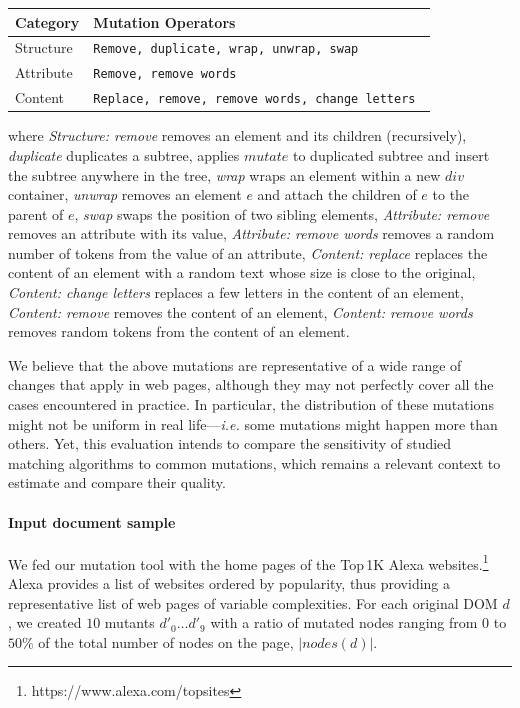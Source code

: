 \begin{center}
    \begin{table}[h]
    \begin{tabular}{l|l}
    \hline
    Category  & Mutation Operators                       \\ \hline
    Structure & \tt Remove, duplicate, wrap, unwrap, swap    \\
    Attribute & \tt Remove, remove words                     \\
    Content   & \tt Replace, remove, remove words, change letters \\ \hline
    \end{tabular}
    \end{table}
\end{center}
where
\textit{Structure: remove} removes an element and its children (recursively), 
\textit{duplicate} duplicates a subtree, applies $mutate$ to duplicated subtree and insert the subtree anywhere in the tree,
\textit{wrap} wraps an element within a new $div$ container,
\textit{unwrap} removes an element $e$ and attach the children of $e$ to the parent of $e$,
\textit{swap} swaps the position of two sibling elements,
\textit{Attribute: remove} removes an attribute with its value,
\textit{Attribute: remove words} removes a random number of tokens from the value of an attribute,
\textit{Content: replace} replaces the content of an element with a random text whose size is close to the original,
\textit{Content: change letters} replaces a few letters in the content of an element,
\textit{Content: remove} removes the content of an element,
\textit{Content: remove words} removes random tokens from the content of an element.

We believe that the above mutations are representative of a wide range of changes that apply in web pages, although they may not perfectly cover all the cases encountered in practice.
In particular, the distribution of these mutations might not be uniform in real life---\emph{i.e.} some mutations might happen more than others.
Yet, this evaluation intends to compare the sensitivity of studied matching algorithms to common mutations, which remains a relevant context to estimate and compare their quality.

\paragraph{Input document sample}
We fed our mutation tool with the home pages of the Top\,1K Alexa websites.\footnote{https://www.alexa.com/topsites}
Alexa provides a list of websites ordered by popularity, thus providing a representative list of web pages of variable complexities.
For each original DOM $d$, we created $10$ mutants $d'_0\dots d'_9$ with a ratio of mutated nodes ranging from $0$ to $50\%$ of the total number of nodes on the page, $|nodes(d)|$.

